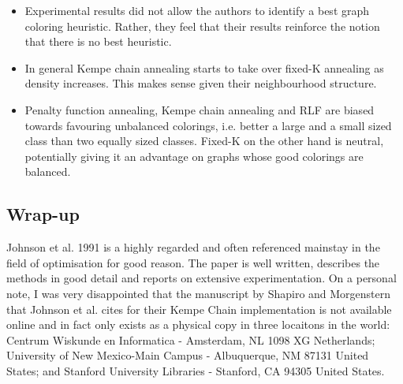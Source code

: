 \begin{itemize}
	\item Experimental results did not allow the authors to identify a best graph coloring heuristic. Rather, they feel that their results reinforce the notion that there is no best heuristic.
	\item In general Kempe chain annealing starts to take over fixed-K annealing as density increases. This makes sense given their neighbourhood structure.
	\item Penalty function annealing, Kempe chain annealing and RLF are biased towards favouring unbalanced colorings, i.e. better a large and a small sized class than two equally sized classes. Fixed-K on the other hand is neutral, potentially giving it an advantage on graphs whose good colorings are balanced.
	\end{itemize}

\subsection{Wrap-up}

Johnson et al. 1991 is a highly regarded and often referenced mainstay in the field of optimisation for good reason. The paper is well written, describes the methods in good detail and reports on extensive experimentation. 
On a personal note, I was very disappointed that the manuscript by Shapiro and Morgenstern that Johnson et al. cites for their Kempe Chain implementation is not available online and in fact only exists as a physical copy in three locaitons in the world: Centrum Wiskunde en Informatica - Amsterdam, NL 1098 XG Netherlands; University of New Mexico-Main Campus - Albuquerque, NM 87131 United States; and Stanford University Libraries - Stanford, CA 94305 United States.



